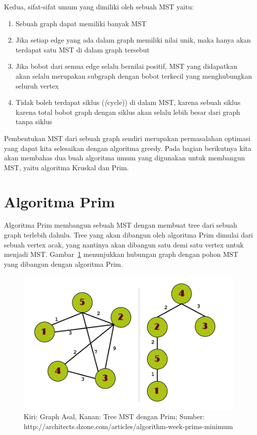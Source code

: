 Kedua, sifat-sifat umum yang dimiliki oleh sebuah MST yaitu:

\begin{enumerate}
    \item Sebuah graph dapat memiliki banyak MST
    \item Jika setiap edge yang ada dalam graph memiliki nilai unik, maka hanya akan terdapat satu MST di dalam graph tersebut
    \item Jika bobot dari semua edge selalu bernilai positif, MST yang didapatkan akan selalu merupakan subgraph dengan bobot terkecil yang menghubungkan seluruh vertex
    \item Tidak boleh terdapat siklus (\textit(cycle)) di dalam MST, karena sebuah siklus karena total bobot graph dengan siklus akan selalu lebih besar dari graph tanpa siklus
\end{enumerate}

Pembentukan MST dari sebuah graph sendiri merupakan permasalahan optimasi yang dapat kita selesaikan dengan algoritma greedy. Pada bagian berikutnya kita akan membahas dua buah algoritma umum yang digunakan untuk membangun MST, yaitu algoritma Kruskal dan Prim.

\section{Algoritma Prim}

Algoritma Prim membangun sebuah MST dengan membuat tree dari sebuah graph terlebih dahulu. Tree yang akan dibangun oleh algoritma Prim dimulai dari sebuah vertex acak, yang nantinya akan dibangun satu demi satu vertex untuk menjadi MST. Gambar~\ref{fig:prims-proc} menunjukkan hubungan graph dengan pohon MST yang dibangun dengan algoritma Prim.

\begin{figure}
    \includegraphics[width=\textwidth,keepaspectratio]{fig/PrimsProc.png}%
	\caption{Kiri: Graph Asal, Kanan: Tree MST dengan Prim; Sumber: http://architects.dzone.com/articles/algorithm-week-prims-minimum}%
	\label{fig:prims-proc}%
\end{figure}


